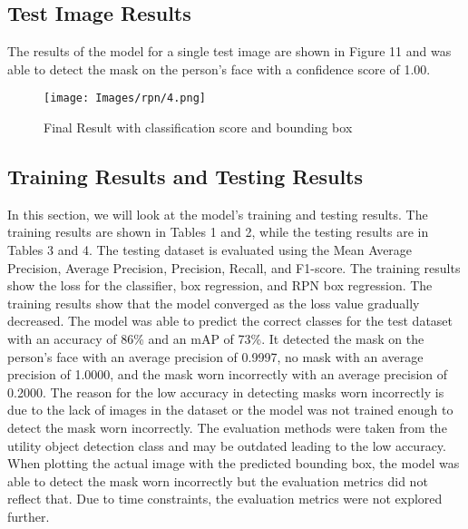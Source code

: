 \documentclass[conference]{IEEEtran}
\begin{document}
\subsection{Test Image Results}
The results of the model for a single test image are shown in Figure 11 and was able to detect the mask on the person's face with a confidence score of 1.00. 

    \begin{figure}[!htbp]
        \centering
        \texttt{[image: Images/rpn/4.png]}
        \caption{Final Result with classification score and bounding box}
        \label{fig:my_label}
    \end{figure}
    \FloatBarrier

\subsection{Training Results and Testing Results}

In this section, we will look at the model's training and testing results. The training results are shown in Tables 1 and 2, while the testing results are 
in Tables 3 and 4. The testing dataset is evaluated using the Mean Average Precision, Average Precision, Precision, Recall, and F1-score.
The training results show the loss for the classifier, box regression, and RPN box regression. The training results show that the model converged as the 
loss value gradually decreased. 
The model was able to predict the correct classes for the test dataset with an accuracy of 86\% and an mAP of 73\%. It detected the mask on the person's face with an average precision of 0.9997, no mask with an average precision of 1.0000, and the mask worn 
incorrectly with an average precision of 0.2000. The reason for the low accuracy in detecting masks worn incorrectly is due to the lack of images in the dataset 
or the model was not trained enough to detect the mask worn incorrectly. The evaluation methods were taken from the utility object detection class and may 
be outdated leading to the low accuracy. When plotting the actual image with the predicted bounding box, the model was able to detect the mask worn incorrectly
but the evaluation metrics did not reflect that. Due to time constraints, the evaluation metrics were not explored further.
\end{document}

